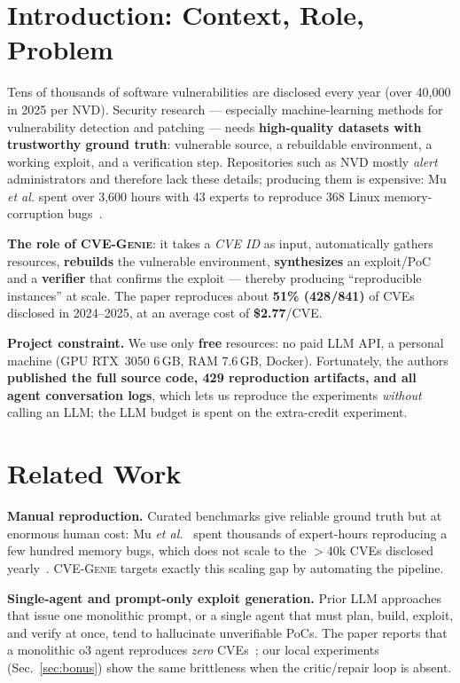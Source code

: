 \documentclass[conference,10pt,a4paper]{IEEEtran}
\begin{document}
\section{Introduction: Context, Role, Problem}

Tens of thousands of software vulnerabilities are disclosed every year (over 40,000 in 2025 per NVD). Security research --- especially machine-learning methods for vulnerability detection and patching --- needs \textbf{high-quality datasets with trustworthy ground truth}: vulnerable source, a rebuildable environment, a working exploit, and a verification step. Repositories such as NVD mostly \textit{alert} administrators and therefore lack these details; producing them is expensive: Mu \textit{et al.} spent over 3,600 hours with 43 experts to reproduce 368 Linux memory-corruption bugs~\cite{cvegenie}.

\textbf{The role of CVE-G\textsc{enie}}: it takes a \textit{CVE ID} as input, automatically gathers resources, \textbf{rebuilds} the vulnerable environment, \textbf{synthesizes} an exploit/PoC and a \textbf{verifier} that confirms the exploit --- thereby producing ``reproducible instances'' at scale. The paper reproduces about \textbf{51\% (428/841)} of CVEs disclosed in 2024--2025, at an average cost of \textbf{\$2.77}/CVE.

\textbf{Project constraint.} We use only \textbf{free} resources: no paid LLM API, a personal machine (GPU RTX~3050 6\,GB, RAM 7.6\,GB, Docker). Fortunately, the authors \textbf{published the full source code, 429 reproduction artifacts, and all agent conversation logs}, which lets us reproduce the experiments \textit{without} calling an LLM; the LLM budget is spent on the extra-credit experiment.

\section{Related Work}
\textbf{Manual reproduction.} Curated benchmarks give reliable ground truth but at enormous human cost: Mu \textit{et al.}~\cite{mu} spent thousands of expert-hours reproducing a few hundred memory bugs, which does not scale to the $>$40k CVEs disclosed yearly~\cite{nvd}. CVE-G\textsc{enie} targets exactly this scaling gap by automating the pipeline.

\textbf{Single-agent and prompt-only exploit generation.} Prior LLM approaches that issue one monolithic prompt, or a single agent that must plan, build, exploit, and verify at once, tend to hallucinate unverifiable PoCs. The paper reports that a monolithic o3 agent reproduces \textit{zero} CVEs~\cite{cvegenie}; our local experiments (Sec.~\ref{sec:bonus}) show the same brittleness when the critic/repair loop is absent.
\end{document}
